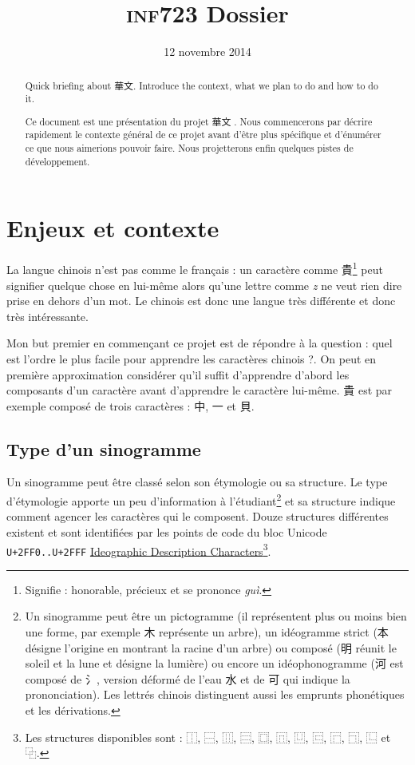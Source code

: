 \documentclass[12pt,oneside]{article}
\title{\textsc{inf723} Dossier}
\date{12 novembre 2014}
\begin{document}
\maketitle
\begin{abstract}\foreignlanguage{english}{Quick briefing about {華文}. Introduce the context, what we plan to do and how to do it.}

Ce document est une présentation du projet \og 華文 \fg{}. Nous commencerons par décrire rapidement le contexte général de ce projet avant d'être plus spécifique et d'énumérer ce que nous aimerions pouvoir faire. Nous projetterons enfin quelques pistes de développement.\end{abstract}
\tableofcontents

\section{Enjeux et contexte}

La langue chinois n'est pas comme le français : un caractère comme {貴}\footnote{Signifie : honorable, précieux et se prononce \textsl{guì}.} peut signifier quelque chose en lui-même alors qu'une lettre comme \textsl{z} ne veut rien dire prise en dehors d'un mot. Le chinois est donc une langue très différente et donc très intéressante.

Mon but premier en commençant ce projet est de répondre à la question : \og quel est l'ordre le plus facile pour apprendre les caractères chinois ?\fg{}. On peut en première approximation considérer qu'il suffit d'apprendre d'abord les composants d'un caractère avant d'apprendre le caractère lui-même. 貴 est par exemple composé de trois caractères : {中}, 一 et {貝}.

\subsection{Type d'un sinogramme}

Un sinogramme peut être classé selon son étymologie ou sa structure. Le type d'étymologie apporte un peu d'information à l'étudiant\footnote{Un sinogramme peut être un pictogramme (il représentent plus ou moins bien une forme, par exemple 木 représente un arbre), un idéogramme strict ({本} désigne l'origine en montrant la racine d'un arbre) ou composé ({明} réunit le soleil et la lune et désigne la lumière) ou encore un idéophonogramme ({河} est composé de {氵}, version déformé de l'eau {水} et de {可} qui indique la prononciation). Les lettrés chinois distinguent aussi les emprunts phonétiques et les dérivations.} et sa structure indique comment agencer les caractères qui le composent. Douze structures différentes existent et sont identifiées par les points de code du bloc Unicode \texttt{U+2FF0..U+2FFF} \href{https://en.wikipedia.org/wiki/Ideographic\_Description\_Characters\_\%28Unicode\_block\%29}{Ideographic Description Characters}\footnote{Les structures disponibles sont : {⿰}, {⿱}, {⿲}, {⿳}, {⿴}, {⿵}, {⿶}, {⿷}, {⿸}, {⿹}, {⿺} et {⿻}.}.
\end{document}
